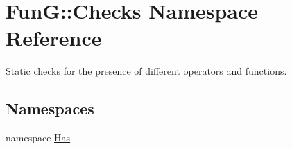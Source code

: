 \hypertarget{namespaceFunG_1_1Checks}{\section{\-Fun\-G\-:\-:\-Checks \-Namespace \-Reference}
\label{namespaceFunG_1_1Checks}
}


\-Static checks for the presence of different operators and functions.  


\subsection*{\-Namespaces}
\begin{DoxyCompactItemize}
\item 
namespace \hyperlink{namespaceFunG_1_1Checks_1_1Has}{\-Has}
\end{DoxyCompactItemize}
